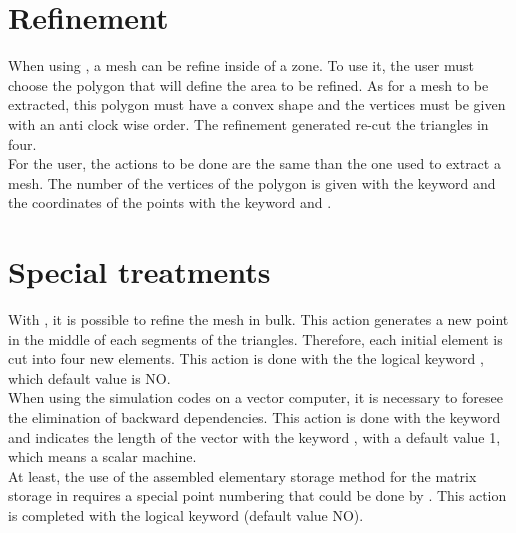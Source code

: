 \section{Refinement}
When using \stbtel, a mesh can be refine inside of a zone. To use it, the user
must choose the polygon that will define the area to be refined. As for a mesh
to be extracted, this polygon must have a convex shape and the vertices must be
given with an anti clock wise order. The refinement  generated re-cut the
triangles in four.\\
For the user, the actions to be done are the same than the one used to extract
a mesh.  The number of the vertices of the polygon is given with the keyword
 and the
coordinates of the points with the keyword  and .
\section{Special treatments}
With \stbtel, it is possible to refine the mesh in bulk. This action generates
a new point in the middle of each segments of the triangles. Therefore, each
initial element is cut into four new elements. This action is done with the the
logical keyword , which default value is NO.\\
When using the simulation codes on a vector computer, it is necessary to
foresee the elimination of backward dependencies. This action is done with the
keyword  and indicates the
length of the vector with the keyword , with a default
value 1, which means a scalar machine.\\
At least, the use of the assembled elementary storage method for the matrix
storage in  requires a special point numbering that could be done by
\stbtel. This action is completed with the logical keyword  (default value NO).
